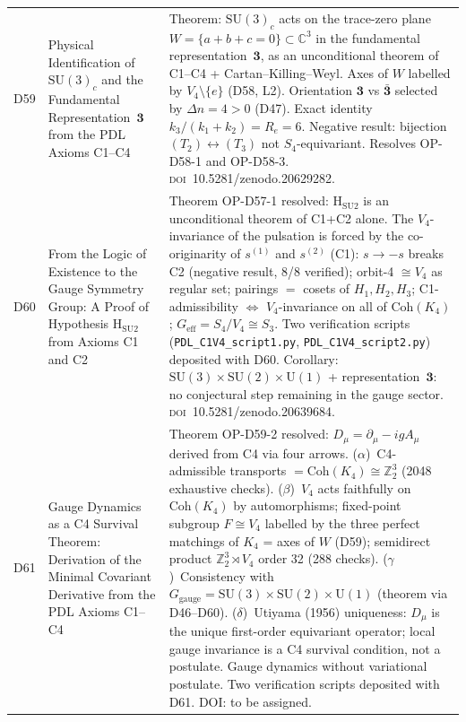 \documentclass[11pt,a4paper]{article}
\theoremstyle{plain}
\theoremstyle{definition}
\theoremstyle{remark}
\begin{document}
\begin{longtable}{L{1.3cm}L{3.8cm}L{8.0cm}}
D59 & Physical Identification of $\mathrm{SU}(3)_c$ and the Fundamental Representation~$\mathbf{3}$ from the PDL Axioms C1--C4~\cite{D59} & \textcolor{proofblue}{Theorem}: $\mathrm{SU}(3)_c$ acts on the trace-zero plane $W = \{a+b+c=0\}\subset\mathbb{C}^3$ in the fundamental representation~$\mathbf{3}$, as an unconditional theorem of C1--C4 + Cartan--Killing--Weyl. Axes of $W$ labelled by $V_4\setminus\{e\}$ (D58, L2). Orientation $\mathbf{3}$ vs $\bar{\mathbf{3}}$ selected by $\Delta n = 4 > 0$ (D47). Exact identity $k_3/(k_1+k_2) = R_e = 6$. Negative result: bijection $(T_2)\leftrightarrow(T_3)$ not $S_4$-equivariant. Resolves OP-D58-1 and OP-D58-3. \textsc{doi}~10.5281/zenodo.20629282.\\[0.4em]
D60 & From the Logic of Existence to the Gauge Symmetry Group: A Proof of Hypothesis H$_{\mathrm{SU2}}$ from Axioms C1 and C2~\cite{D60} & \textcolor{proofblue}{Theorem} OP-D57-1 resolved: H$_{\mathrm{SU2}}$ is an unconditional theorem of C1+C2 alone. The $V_4$-invariance of the pulsation is forced by the co-originarity of $s^{(1)}$ and $s^{(2)}$ (C1): $s \to -s$ breaks C2 (negative result, 8/8 verified); orbit-4 $\cong V_4$ as regular set; pairings $= $ cosets of $H_1,H_2,H_3$; C1-admissibility $\Leftrightarrow$ $V_4$-invariance on all of $\mathrm{Coh}(K_4)$; $G_{\mathrm{eff}} = S_4/V_4 \cong S_3$. Two verification scripts (\texttt{PDL\_C1V4\_script1.py}, \texttt{PDL\_C1V4\_script2.py}) deposited with D60. Corollary: $\mathrm{SU}(3)\times\mathrm{SU}(2)\times\mathrm{U}(1)$ + representation~$\mathbf{3}$: no conjectural step remaining in the gauge sector. \textsc{doi}~10.5281/zenodo.20639684.\\[0.4em]
D61 & Gauge Dynamics as a C4 Survival Theorem: Derivation of the Minimal Covariant Derivative from the PDL Axioms C1--C4~\cite{D61} & \textcolor{proofblue}{Theorem} OP-D59-2 resolved: $D_\mu = \partial_\mu - igA_\mu$ derived from C4 via four arrows. ($\alpha$)~C4-admissible transports $= \mathrm{Coh}(K_4) \cong \mathbb{Z}_2^3$ (2048 exhaustive checks). ($\beta$)~$V_4$ acts faithfully on $\mathrm{Coh}(K_4)$ by automorphisms; fixed-point subgroup $F \cong V_4$ labelled by the three perfect matchings of $K_4$ = axes of $W$ (D59); semidirect product $\mathbb{Z}_2^3\rtimes V_4$ order 32 (288 checks). ($\gamma$)~Consistency with $G_{\mathrm{gauge}} = \mathrm{SU}(3)\times\mathrm{SU}(2)\times\mathrm{U}(1)$ (theorem via D46--D60). ($\delta$)~Utiyama (1956) uniqueness: $D_\mu$ is the unique first-order equivariant operator; local gauge invariance is a C4 survival condition, not a postulate. Gauge dynamics without variational postulate. Two verification scripts deposited with D61. DOI: to be assigned.\\[0.4em]

\end{longtable}
\end{document}
